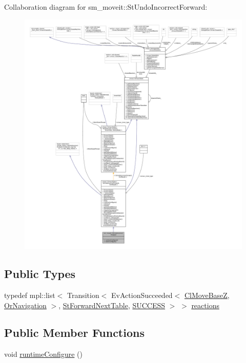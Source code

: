Collaboration diagram for sm\+\_\+moveit\+:\+:St\+Undo\+Incorrect\+Forward\+:
\nopagebreak
\begin{figure}[H]
\begin{center}
\leavevmode
\includegraphics[width=350pt]{structsm__moveit_1_1StUndoIncorrectForward__coll__graph}
\end{center}
\end{figure}
\subsection*{Public Types}
\begin{DoxyCompactItemize}
\item 
typedef mpl\+::list$<$ Transition$<$ Ev\+Action\+Succeeded$<$ \hyperlink{classcl__move__base__z_1_1ClMoveBaseZ}{Cl\+Move\+BaseZ}, \hyperlink{classsm__moveit_1_1OrNavigation}{Or\+Navigation} $>$, \hyperlink{structsm__moveit_1_1StForwardNextTable}{St\+Forward\+Next\+Table}, \hyperlink{classSUCCESS}{S\+U\+C\+C\+E\+SS} $>$ $>$ \hyperlink{structsm__moveit_1_1StUndoIncorrectForward_a2c215b9ade720f753b2aa4719f96e787}{reactions}
\end{DoxyCompactItemize}
\subsection*{Public Member Functions}
\begin{DoxyCompactItemize}
\item 
void \hyperlink{structsm__moveit_1_1StUndoIncorrectForward_a197a93d373ee512d7f3878fe738cf958}{runtime\+Configure} ()
\end{DoxyCompactItemize}
